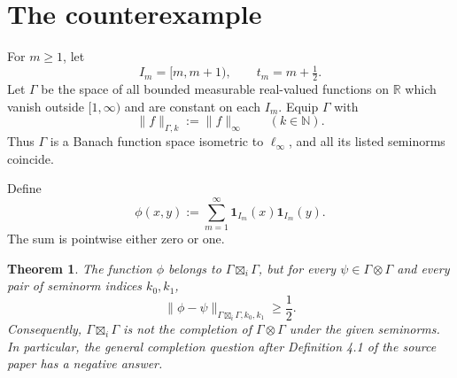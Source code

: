 \documentclass[11pt]{article}
\newcommand{\R}{\mathbb R}
\newcommand{\N}{\mathbb N}
\newcommand{\G}{\Gamma}
\newcommand{\bi}{\mathbin{\boxtimes_{i}}}
\newtheorem{theorem}{Theorem}
\begin{document}
\section{The counterexample}

For $m\geq1$, let
\[
 I_m=[m,m+1),\qquad t_m=m+\tfrac12.
\]
Let $\G$ be the space of all bounded measurable real-valued functions on
$\R$ which vanish outside $[1,\infty)$ and are constant on each $I_m$.
Equip $\G$ with
\[
 \|f\|_{\G,k}:=\|f\|_\infty\qquad(k\in\N).
\]
Thus $\G$ is a Banach function space isometric to $\ell_\infty$, and all its
listed seminorms coincide.

Define
\begin{equation}\label{eq:phi}
 \phi(x,y):=\sum_{m=1}^{\infty}\mathbf 1_{I_m}(x)\mathbf 1_{I_m}(y).
\end{equation}
The sum is pointwise either zero or one.

\begin{theorem}\label{thm:main}
The function $\phi$ belongs to $\G\bi\G$, but for every
$\psi\in\G\otimes\G$ and every pair of seminorm indices $k_0,k_1$,
\[
 \|\phi-\psi\|_{\G\bi\G,k_0,k_1}\geq\frac12.
\]
Consequently, $\G\bi\G$ is not the completion of $\G\otimes\G$ under the
given seminorms.  In particular, the general completion question after
Definition 4.1 of the source paper has a negative answer.
\end{theorem}
\end{document}
